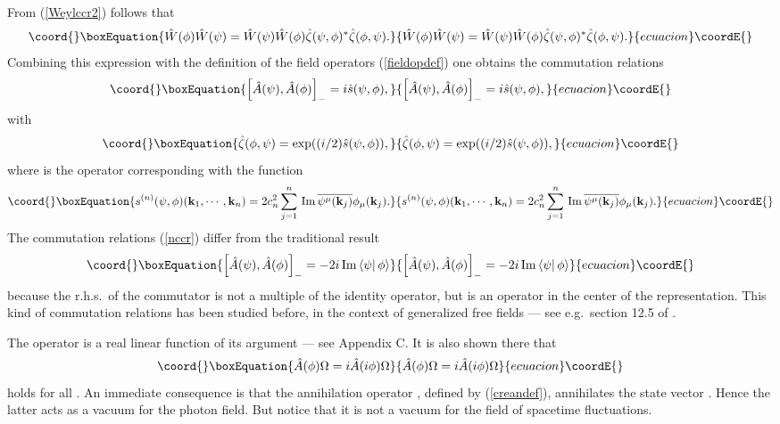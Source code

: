 \documentclass[12pt,a4paper]{article}
\def\kk{{\bf k}}
\renewcommand{\Im}{\,{\rm Im}\,}
\begin{document}
From (\ref{Weylccr2}) follows that
\begin{equation}\coord{}\boxEquation{
\hat W(\phi)\hat W(\psi)=
\hat W(\psi)\hat W(\phi)\hat\zeta(\psi,\phi)^*\hat\zeta(\phi,\psi).
}{
\hat W(\phi)\hat W(\psi)=
\hat W(\psi)\hat W(\phi)\hat\zeta(\psi,\phi)^*\hat\zeta(\phi,\psi).
}{ecuacion}\coordE{}\end{equation}
Combining this expression with the definition of the field operators (\ref{fieldopdef})
one obtains the commutation relations
\begin{equation}\coord{}\boxEquation{
\left[\hat A(\psi),\hat A(\phi)\right]_-
=i\hat s(\psi,\phi),
\label{nccr}
}{
\left[\hat A(\psi),\hat A(\phi)\right]_-
=i\hat s(\psi,\phi),
}{ecuacion}\coordE{}\end{equation}
with
\begin{equation}\coord{}\boxEquation{
\hat\zeta(\phi,\psi)=\exp((i/2)\hat s(\psi,\phi)),
}{
\hat\zeta(\phi,\psi)=\exp((i/2)\hat s(\psi,\phi)),
}{ecuacion}\coordE{}\end{equation}
where \coordHE{} is the operator corresponding with the function
\begin{equation}\coord{}\boxEquation{
s^{(n)}(\psi,\phi)(\kk_1,\cdots,\kk_n)
=2c_n^2\sum_{j=1}^n\Im\overline {\psi^\mu(\kk_j)}\phi_\mu(\kk_j).
}{
s^{(n)}(\psi,\phi)(\kk_1,\cdots,\kk_n)
=2c_n^2\sum_{j=1}^n\Im\overline {\psi^\mu(\kk_j)}\phi_\mu(\kk_j).
}{ecuacion}\coordE{}\end{equation}
The commutation relations (\ref{nccr}) differ from the traditional
result
\begin{equation}\coord{}\boxEquation{
\left[\hat A(\psi),\hat A(\phi)\right]_-
=-2i\Im\langle\psi|\,\phi\rangle
}{
\left[\hat A(\psi),\hat A(\phi)\right]_-
=-2i\Im\langle\psi|\,\phi\rangle
}{ecuacion}\coordE{}\end{equation}
because the r.h.s.~of the commutator is not a multiple of
the identity operator, but is an operator in the
center of the representation. This kind of commutation relations
has been studied before, in the context of
generalized free fields --- see e.g.~section 12.5 of \cite {BLT75}.

The operator \coordHE{} is a real linear function of its
argument \myHighlight{$\phi$}\coordHE{} --- see Appendix C. It is also shown there that
\begin{equation}\coord{}\boxEquation{
\hat A(\phi)\Omega=i\hat A(i\phi)\Omega
\label{idep}
}{
\hat A(\phi)\Omega=i\hat A(i\phi)\Omega
}{ecuacion}\coordE{}\end{equation}
holds for all \myHighlight{$\phi$}\coordHE{}.
An immediate consequence is that the annihilation operator \coordHE{},
defined by (\ref{creandef}), annihilates the state vector \myHighlight{$\Omega$}\coordHE{}. Hence the latter acts
as a vacuum for the photon field. But notice that it is not a vacuum for the field
of spacetime fluctuations.
\end{document}

